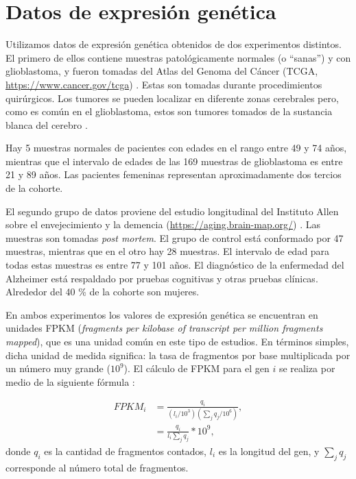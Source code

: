 \section{Datos de expresión genética}
Utilizamos datos de expresión genética obtenidos de dos experimentos distintos. El primero de ellos contiene muestras patológicamente normales (o ``sanas'') y con glioblastoma, y fueron tomadas del Atlas del Genoma del Cáncer (TCGA, \href{https://www.cancer.gov/tcga}{https://www.cancer.gov/tcga}) \cite{Brennan_2013, Tomczak2015}. Estas son tomadas durante procedimientos quirúrgicos. Los tumores se pueden localizar en diferente zonas cerebrales pero, como es común en el glioblastoma, estos son tumores tomados de la sustancia blanca del cerebro \cite{ellingson2013probabilistic}.

Hay 5 muestras normales de pacientes con edades en el rango entre 49 y 74 años, mientras que el intervalo de edades de las 169 muestras de glioblastoma es entre 21 y 89 años. Las pacientes femeninas representan aproximadamente dos tercios de la cohorte.

El segundo grupo de datos proviene del estudio longitudinal del Instituto Allen sobre el envejecimiento y la demencia (\href{https://aging.brain-map.org/}{https://aging.brain-map.org/}) \cite{Miller_2017}. Las muestras son tomadas \textit{post mortem}. El grupo de control está conformado por 47 muestras, mientras que en el otro hay 28 muestras. El intervalo de edad para todas estas muestras es entre 77 y 101 años. El diagnóstico de la enfermedad del Alzheimer está respaldado por pruebas cognitivas y otras pruebas clínicas. Alrededor del 40 \% de la cohorte son mujeres.

En ambos experimentos los valores de expresión genética se encuentran en unidades FPKM (\textit{fragments per kilobase of transcript per million fragments mapped}), que es una unidad común en este tipo de estudios. En términos simples, dicha unidad de medida significa: la tasa de fragmentos por base multiplicada por un número muy grande ($ 10^9 $). El cálculo de FPKM para el gen $ i $ se realiza por medio de la siguiente fórmula \cite{Zhao_2021}:

\begin{equation}
	\begin{split}
		FPKM_i &= \frac{q_i}{(l_i/10^3) (\sum_{j}q_j/10^6)} ,\\
		&= \frac{q_i}{l_i \sum_j q_j} * 10^9,
	\end{split}
\end{equation}
donde $ q_i $ es la cantidad de fragmentos contados, $ l_i $ es la longitud del gen, y $ \sum_j q_j $ corresponde al número total de fragmentos.

